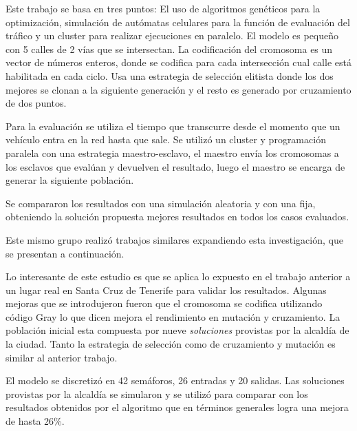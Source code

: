 \begin{itemize}
	\begin{item}
		
		Este trabajo se basa en tres puntos: El uso de algoritmos genéticos para la optimización, simulación de autómatas celulares para la función de evaluación del tráfico y un cluster para realizar ejecuciones en paralelo.
		El modelo es pequeño con 5 calles de 2 vías que se intersectan.
		La codificación del cromosoma es un vector de números enteros, donde se codifica para cada intersección cual calle está habilitada en cada ciclo.
		Usa una estrategia de selección elitista donde los dos mejores se clonan a la siguiente generación y el resto es generado por cruzamiento de dos puntos.
		
		Para la evaluación se utiliza el tiempo que transcurre desde el momento que un vehículo entra en la red hasta que sale. Se utilizó un cluster y programación paralela con una estrategia maestro-esclavo, el maestro envía los cromosomas a los esclavos que evalúan y devuelven el resultado, luego el maestro se encarga de generar la siguiente población.
		
		Se compararon los resultados con una simulación aleatoria y con una fija, obteniendo la solución propuesta mejores resultados en todos los casos evaluados.
		
		Este mismo grupo realizó trabajos similares expandiendo esta investigación, que se presentan a continuación.
	\end{item}
	
	\begin{item}
		\bibentry{Sanchez2008}
		Lo interesante de este estudio es que se aplica lo expuesto en el trabajo anterior a un lugar real en Santa Cruz de Tenerife para validar los resultados.
		Algunas mejoras que se introdujeron fueron que el cromosoma se codifica utilizando código Gray lo que dicen mejora el rendimiento en mutación y cruzamiento. La población inicial esta compuesta por nueve \emph{soluciones} provistas por la alcaldía de la ciudad. Tanto la estrategia de selección como de cruzamiento y mutación es similar al anterior trabajo.
		
		El modelo se discretizó en 42 semáforos, 26 entradas y 20 salidas.
		Las soluciones provistas por la alcaldía se simularon y se utilizó para comparar con los resultados obtenidos por el algoritmo que en términos generales logra una mejora de hasta 26\%.
		
	\end{item}
	

\end{itemize}
